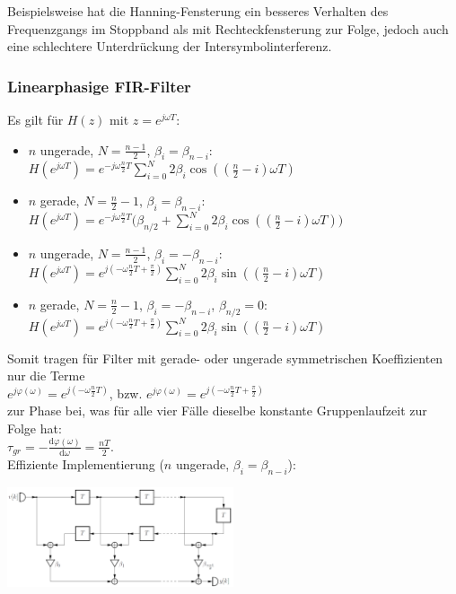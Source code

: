 \documentclass[a4paper,landscape,6pt]{article}
\newcommand{\diff}[2]{\frac{\mathrm{d}#1}{\mathrm{d}#2}}
\begin{document}
\begin{multicols}{3}
Beispielsweise hat die Hanning-Fensterung ein besseres Verhalten des Frequenzgangs im Stoppband als mit Rechteckfensterung zur Folge, jedoch auch eine schlechtere Unterdrückung der Intersymbolinterferenz.

\subsubsection*{Linearphasige FIR-Filter}
 Es gilt für $H(z)$ mit $z=e^{j\omega T}$:
\begin{itemize}
	\item $n$ ungerade, $N = \frac{n-1}{2}$, $\beta_i = \beta_{n-i}$:\\
	$H(e^{j\omega T}) = e^{-j\omega\frac{n}{2}T} \sum\limits_{i=0}^{N} 2\beta_i \cos((\frac{n}{2}-i)\omega T)$
	\item $n$ gerade, $N = \frac{n}{2}-1$, $\beta_i = \beta_{n-i}$:\\
	$H(e^{j\omega T}) = e^{-j\omega\frac{n}{2}T} \big(\beta_{n/2} + \sum\limits_{i=0}^{N} 2\beta_i \cos((\frac{n}{2}-i)\omega T)\big)$
	\item $n$ ungerade, $N = \frac{n-1}{2}$, $\beta_i = -\beta_{n-i}$:\\
	$H(e^{j\omega T}) = e^{j(-\omega\frac{n}{2}T + \frac{\pi}{2})} \sum\limits_{i=0}^{N} 2\beta_i \sin((\frac{n}{2}-i)\omega T)$
	\item $n$ gerade, $N = \frac{n}{2}-1$, $\beta_i = -\beta_{n-i}$, $\beta_{n/2} = 0$:\\
	$H(e^{j\omega T}) = e^{j(-\omega\frac{n}{2}T + \frac{\pi}{2})} \sum\limits_{i=0}^{N} 2\beta_i \sin((\frac{n}{2}-i)\omega T)$
\end{itemize}

Somit tragen für Filter mit gerade- oder ungerade symmetrischen Koeffizienten nur die Terme \\
$e^{j\varphi (\omega)} = e^{j(-\omega\frac{n}{2}T)}$, bzw. $e^{j\varphi (\omega)} = e^{j(-\omega\frac{n}{2}T + \frac{\pi}{2})}$ \\ 
zur Phase bei, was für alle vier Fälle dieselbe konstante Gruppenlaufzeit zur Folge hat:\\

\tab \tab $\boxed{\tau_{gr} = - \diff{\varphi(\omega)}{\omega} = \frac{nT}{2}}$.\\

Effiziente Implementierung ($n$ ungerade, $\beta_i = \beta_{n-i}$):\\
\begin{minipage}[t]{0.6\textwidth}
	\includegraphics[width=0.5\textwidth]{images_ssp/FIR_linPha}\\
\end{minipage}

\end{multicols}
\end{document}
